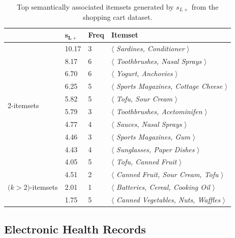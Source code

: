 \begin{table}
\begin{center}
\begin{tabular}{l|l| l | l }
  \hline
&$\mathbf{s_{L+}}$       &\textbf{Freq}&   \textbf{Itemset}\\
  \hline\hline
\multirow{10}{*}{2-itemsets}& 10.17	&	3	&$\langle$\emph{	Sardines,	Conditioner	}$\rangle$\\
&8.17	&	6	&$\langle$\emph{	Toothbrushes,	Nasal Sprays	}$\rangle$\\
&6.70	&	6	&$\langle$\emph{	Yogurt,	Anchovies	}$\rangle$\\
&6.25	&	5	&$\langle$\emph{	Sports Magazines,	Cottage Cheese	}$\rangle$\\
&5.82	&	5	&$\langle$\emph{	Tofu,	Sour Cream	}$\rangle$\\
&5.79	&	3	&$\langle$\emph{	Toothbrushes,	Acetominifen	}$\rangle$\\
&4.77	&	4	&$\langle$\emph{	Sauces,	Nasal Sprays	}$\rangle$\\
&4.46	&	3	&$\langle$\emph{	Sports Magazines,	Gum	}$\rangle$\\
&4.43	&	4	&$\langle$\emph{	Sunglasses,	Paper Dishes	}$\rangle$\\
&4.05	&	5	&$\langle$\emph{	Tofu,	Canned Fruit	}$\rangle$\\
  \hline
\multirow{3}{*}{\parbox{1cm}{$(k$$>$2$)$-itemsets}}&4.51	&	2	&$\langle$\emph{	Canned Fruit,	Sour Cream,	Tofu	 }$\rangle$\\
&2.01	&	1	&$\langle$\emph{	Batteries,	Cereal,	Cooking Oil	}$\rangle$\\
&1.75	&	5	&$\langle$\emph{	Canned Vegetables,	Nuts,	Waffles	}$\rangle$\\
\hline
\end{tabular}
\end{center}
\caption[Top $s_{L+}$ results on the shopping cart dataset.]{\label{tbl:foodmart_pl} Top semantically associated itemsets generated by $s_{L+}$ from the shopping cart dataset.}
\end{table}

\subsection{Electronic Health Records}
